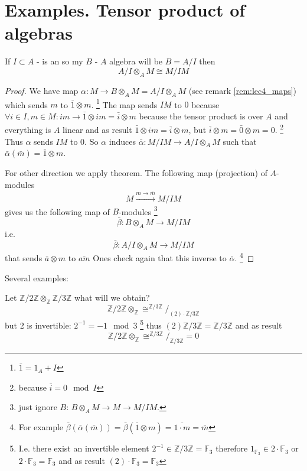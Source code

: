 \section{Examples. Tensor product of algebras}

\begin{proposition}
  If $I \subset A$ - is an  so my $B$ - $A$ algebra
  will be $B = A/I$ then
  \[
  A/I \otimes_A M \cong M/IM
  \]
  \begin{proof}
    We have map $\alpha: M \to B \otimes_A M = A/I \otimes_A M$
    (see remark \ref{rem:lec4_maps}) 
    which sends $m$ to $\bar{1} \otimes m$.
    \footnote{
      $\bar{1} = 1_A + I$
    }
    The map sends $IM$ to $0$
    because
    $\forall i \in I, m \in M : im \to \bar{1} \otimes im = \bar{i} \otimes m$
    because the tensor product is over $A$ and everything is $A$
    linear and as result $\bar{1} \otimes im = \bar{i} \otimes m$,
    but $\bar{i} \otimes m = \bar{0} \otimes m = 0$.
    \footnote{
      because
      $\bar{i} = 0 \mod I$
    }
    Thus $\alpha$ sends $IM$ to 0. So $\alpha$ induces
    $\bar{\alpha}: M/IM \to A/I \otimes_A M$ such that
    $\bar{\alpha}\left(\bar{m}\right) = \bar{1} \otimes m$.

    For other direction we apply  theorem. The
    following map (projection) of $A$-modules
    \[
    M \xrightarrow{m \to \bar{m}} M/IM
    \]
    gives us the following map of $B$-modules
    \footnote{
      just ignore $B$:
      $B \otimes_A M \to M \to M/IM$.
    }
    \[
    \bar{\beta}: B \otimes_A M \to M/IM
    \]
    i.e.
    \[
    \bar{\beta}: A/I \otimes_A M \to M/IM
    \]
    that sends $\bar{a} \otimes m$ to $\bar{am}$
    Ones check again that this inverse to $\bar{\alpha}$.
    \footnote{
      For example
      \(
      \bar{\beta}\left(\bar{\alpha}\left(\bar{m}\right)\right) =
      \bar{\beta}\left(\bar{1} \otimes m\right) = \overline{1 \cdot m} = \bar{m}
      \)
    }
  \end{proof}
  \label{prop:lec4_prop2}
\end{proposition}

Several examples:
\begin{example}
  Let $\mathbb{Z}/2\mathbb{Z} \otimes_\mathbb{Z}
  \mathbb{Z}/3\mathbb{Z}$ what will we obtain?
  \[
  \mathbb{Z}/2\mathbb{Z} \otimes_\mathbb{Z} \cong
  ^{\mathbb{Z}/3\mathbb{Z}}/_{(2) \cdot \mathbb{Z}/3\mathbb{Z}}
  \]
  but 2 is invertible: $2^{-1} = -1 \mod 3$
  \footnote{
    I.e. there exist an invertible element $2^{-1} \in
    \mathbb{Z}/3\mathbb{Z} = \mathbb{F}_3$ therefore
    $1_{\mathbb{F}_3} \in 2 \cdot \mathbb{F}_3$ or
    $2 \cdot \mathbb{F}_3 = \mathbb{F}_3$ and as result
    $(2) \cdot \mathbb{F}_3 = \mathbb{F}_3$
  }
  thus
  $(2)\mathbb{Z}/3\mathbb{Z} =\mathbb{Z}/3\mathbb{Z}$ and as result
   \[
  \mathbb{Z}/2\mathbb{Z} \otimes_\mathbb{Z} \cong
  ^{\mathbb{Z}/3\mathbb{Z}}/_{ \mathbb{Z}/3\mathbb{Z}} = 0
  \]
\end{example}

